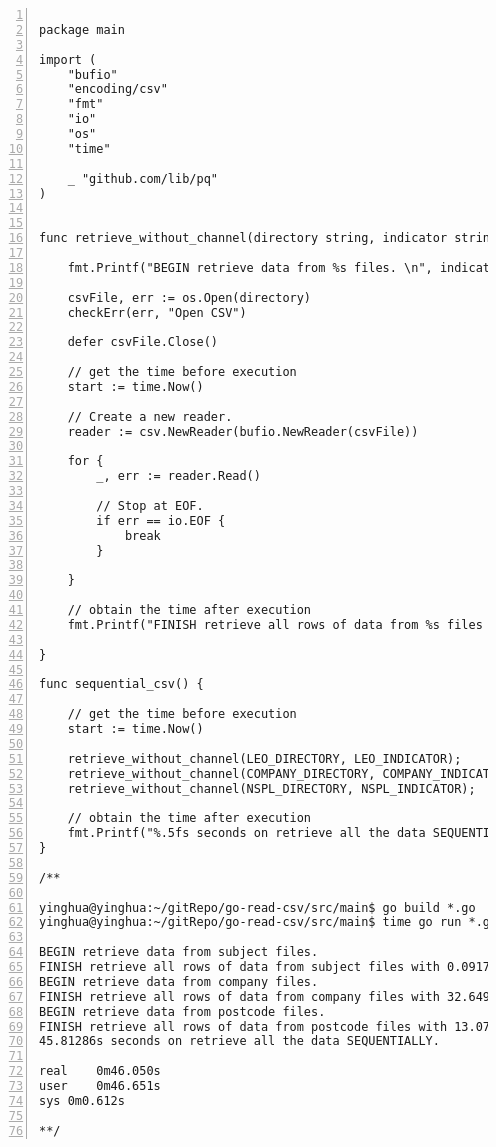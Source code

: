 \lstset{basicstyle=\ttfamily\tiny}  
\begin{lstlisting}[breaklines, frame=single, numbers=left, caption={Go sequential program source codes. (sequential-csv.go)}, label=commandline-02]

package main 

import (
	"bufio"
	"encoding/csv"
	"fmt"
	"io"
	"os"
	"time"
	
	_ "github.com/lib/pq"
)


func retrieve_without_channel(directory string, indicator string) {

	fmt.Printf("BEGIN retrieve data from %s files. \n", indicator);
	
	csvFile, err := os.Open(directory)
	checkErr(err, "Open CSV")
	
	defer csvFile.Close()
	
	// get the time before execution
	start := time.Now()
	
	// Create a new reader.
	reader := csv.NewReader(bufio.NewReader(csvFile))
	
	for {
		_, err := reader.Read()
		
		// Stop at EOF.
		if err == io.EOF {
			break
		}

	}

	// obtain the time after execution
	fmt.Printf("FINISH retrieve all rows of data from %s files with %.5fs seconds. \n", indicator, time.Since(start).Seconds())

}

func sequential_csv() { 

	// get the time before execution
	start := time.Now()
	
	retrieve_without_channel(LEO_DIRECTORY, LEO_INDICATOR);
	retrieve_without_channel(COMPANY_DIRECTORY, COMPANY_INDICATOR);
	retrieve_without_channel(NSPL_DIRECTORY, NSPL_INDICATOR);
	
	// obtain the time after execution
	fmt.Printf("%.5fs seconds on retrieve all the data SEQUENTIALLY. \n", time.Since(start).Seconds())
}

/** 

yinghua@yinghua:~/gitRepo/go-read-csv/src/main$ go build *.go 
yinghua@yinghua:~/gitRepo/go-read-csv/src/main$ time go run *.go 

BEGIN retrieve data from subject files. 
FINISH retrieve all rows of data from subject files with 0.09179 seconds. 
BEGIN retrieve data from company files. 
FINISH retrieve all rows of data from company files with 32.64937 seconds. 
BEGIN retrieve data from postcode files. 
FINISH retrieve all rows of data from postcode files with 13.07156 seconds. 
45.81286s seconds on retrieve all the data SEQUENTIALLY. 

real	0m46.050s
user	0m46.651s
sys	0m0.612s

**/ 

\end{lstlisting}

